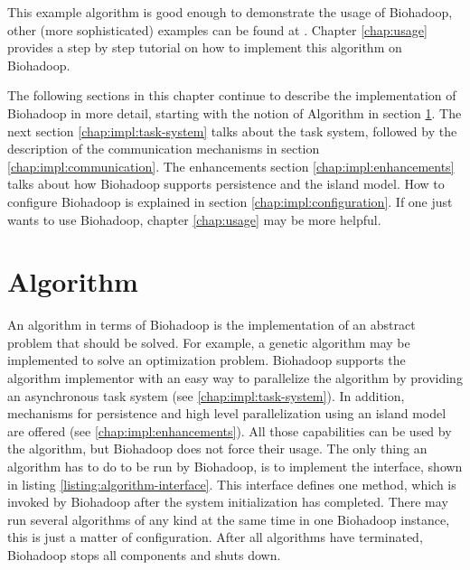   This example algorithm is good enough to demonstrate the usage of Biohadoop, other (more sophisticated) examples can be found at \cite{biohadoop-algorithms}. Chapter \ref{chap:usage} provides a step by step tutorial on how to implement this algorithm on Biohadoop.
  
  The following sections in this chapter continue to describe the implementation of Biohadoop in more detail, starting with the notion of Algorithm in section \ref{chap:impl:algorithm}. The next section \ref{chap:impl:task-system} talks about the task system, followed by the description of the communication mechanisms in section \ref{chap:impl:communication}. The enhancements section \ref{chap:impl:enhancements} talks about how Biohadoop supports persistence and the island model. How to configure Biohadoop is explained in section \ref{chap:impl:configuration}. If one just wants to use Biohadoop, chapter \ref{chap:usage} may be more helpful.
  
\section{Algorithm}
\label{chap:impl:algorithm}
  An algorithm in terms of Biohadoop is the implementation of an abstract problem that should be solved. For example, a genetic algorithm may be implemented to solve an optimization problem. Biohadoop supports the algorithm implementor with an easy way to parallelize the algorithm by providing an asynchronous task system (see \ref{chap:impl:task-system}). In addition, mechanisms for persistence and high level parallelization using an island model are offered (see \ref{chap:impl:enhancements}). All those capabilities can be used by the algorithm, but Biohadoop does not force their usage. The only thing an algorithm has to do to be run by Biohadoop, is to implement the  interface, shown in listing \ref{listing:algorithm-interface}. This interface defines one method, which is invoked by Biohadoop after the system initialization has completed. There may run several algorithms of any kind at the same time in one Biohadoop instance, this is just a matter of configuration. After all algorithms have terminated, Biohadoop stops all components and shuts down.

  
  
